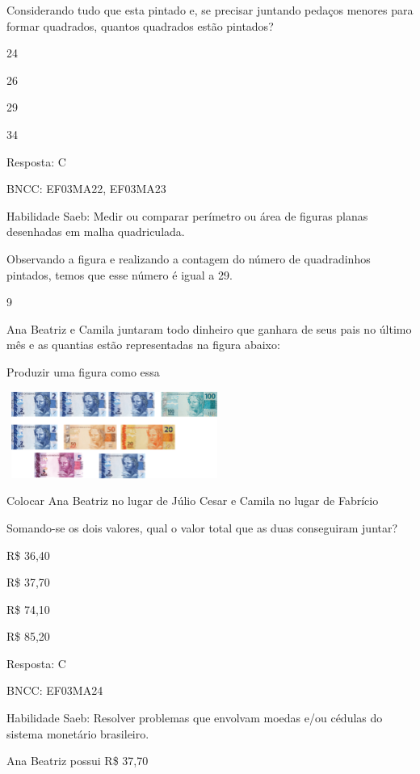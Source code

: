 \begin{escolha}
{\begin{escolha}
{Considerando tudo que esta pintado e, se precisar juntando pedaços
menores para formar quadrados, quantos quadrados estão pintados?

\begin{escolha}
\item
  24
\item
  26
\item
  29
\item
  34
\end{escolha}

Resposta: C

BNCC: EF03MA22, EF03MA23

Habilidade Saeb: Medir ou comparar perímetro ou área de figuras planas
desenhadas em malha quadriculada.

Observando a figura e realizando a contagem do número de quadradinhos
pintados, temos que esse número é igual a 29.

\num{9}

Ana Beatriz e Camila juntaram todo dinheiro que ganhara de seus pais no
último mês e as quantias estão representadas na figura abaixo:

Produzir uma figura como essa

\includegraphics[width=2.77564in,height=1.11703in]{media/image110.png}

Colocar Ana Beatriz no lugar de Júlio Cesar e Camila no lugar de
Fabrício

Somando-se os dois valores, qual o valor total que as duas conseguiram
juntar?

\begin{escolha}
\item
  R\$ 36,40
\item
  R\$ 37,70
\item
  R\$ 74,10
\item
  R\$ 85,20
\end{escolha}

Resposta: C

BNCC: EF03MA24

Habilidade Saeb: Resolver problemas que envolvam moedas e/ou cédulas do
sistema monetário brasileiro.

Ana Beatriz possui R\$ 37,70

}
\end{escolha}}
\end{escolha}
